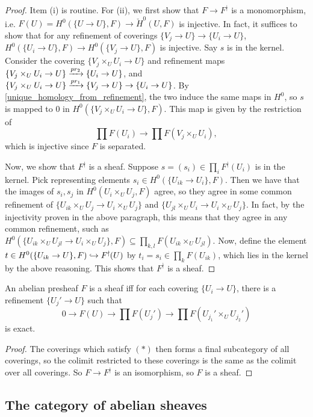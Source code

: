 \documentclass[11pt]{amsart}
\begin{document}
\begin{proof}
    Item (i) is routine. For (ii), we first show that $F\to F^{\nmid}$ is a monomorphism, i.e. $F(U) = H^0(\{U\to U\}, F)\to \check{H}^0(U, F)$ is injective. In fact, it suffices to show that for any refinement of coverings $\{V_j\to U\}\to \{U_i\to U\}$, $H^0(\{U_i\to U\}, F)\to H^0(\{V_j\to U\}, F)$ is injective. Say $s$ is in the kernel. Consider the covering $\{V_j\times_U U_i\to U\}$ and refinement maps $\{V_j\times_U U_i\to U\} \xrightarrow{pr_2} \{U_i\to U\}$, and $\{V_j\times_U U_i\to U\} \xrightarrow{pr_1} \{V_j\to U\} \to \{U_i\to U\}$. By \ref{unique_homology_from_refinement}, the two induce the same maps in $H^0$, so $s$ is mapped to 0 in $H^0(\{V_j\times_U U_i \to U\}, F)$. This map is given by the restriction of
    \[\prod F(U_i) \to \prod F(V_j\times_U U_i),\]
    which is injective since $F$ is separated.

    Now, we show that $F^{\nmid}$ is a sheaf. Suppose $s = (s_i)\in \prod_i F^{\nmid}(U_i)$ is in the kernel. Pick representing elements $s_i \in H^0(\{U_{ik}\to U_i\}, F)$. Then we have that the images of $s_i,s_j$ in $H^0(U_i\times_U U_j, F)$ agree, so they agree in some common refinement of $\{U_{ik}\times_U U_j\to U_i\times_U U_j\}$ and $\{U_{jl}\times_U U_i \to U_i\times_U U_j\}$. In fact, by the injectivity proven in the above paragraph, this means that they agree in any common refinement, such as $H^0(\{U_{ik}\times_U U_{jl} \to U_i\times_U U_j\}, F) \subseteq \prod_{k,l} F(U_{ik}\times_U U_{jl})$. Now, define the element $t\in H^0(\{U_{ik} \to U\}, F) \hookrightarrow F^{\nmid}(U)$ by $t_i = s_i \in \prod_k F(U_{ik})$, which lies in the kernel by the above reasoning. This shows that $F^{\nmid}$ is a sheaf.
\end{proof}

\begin{cor}
    An abelian presheaf $F$ is a sheaf iff for each covering $\{U_i\to U\}$, there is a refinement $\{U_j'\to U\}$ such that
    \[0 \to F(U) \to \prod F(U_j') \to \prod F(U_{j_1}' \times_U U_{j_2}') \tag{$\ast$}\]
    is exact.
\end{cor}

\begin{proof}
    The coverings which satisfy $(\ast)$ then forms a final subcategory of all coverings, so the colimit restricted to these coverings is the same as the colimit over all coverings. So $F\to F^{\nmid}$ is an isomorphism, so $F$ is a sheaf.
\end{proof}


\subsection{The category of abelian sheaves}
\end{document}
